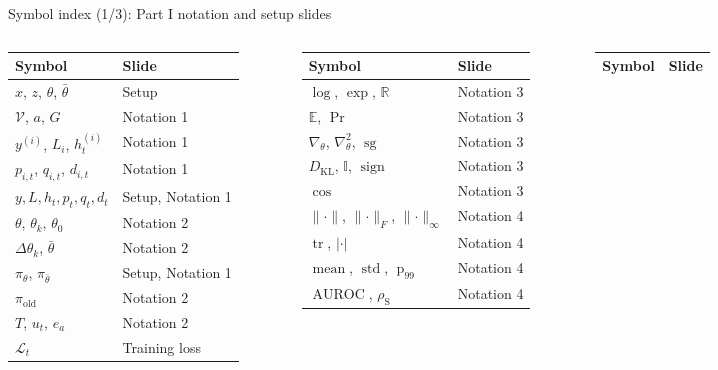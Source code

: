 \documentclass[aspectratio=169,11pt]{beamer}
\newcommand{\E}{\mathbb{E}}
\newcommand{\pit}{\pi_\theta}
\newcommand{\pitea}{\pi_{\bar\theta}}
\newcommand{\piold}{\pi_{\mathrm{old}}}
\newcommand{\sg}{\operatorname{sg}}
\newcommand{\KL}{D_{\mathrm{KL}}}
\newcommand{\Ind}{\mathbb{I}}
\newcommand{\abs}[1]{\lvert #1\rvert}
\newcommand{\norm}[1]{\lVert #1\rVert}
\newcommand{\pct}{\operatorname{p}_{99}}
\newcommand{\AUROC}{\operatorname{AUROC}}
\begin{document}
\begin{frame}{Symbol index (1/3): Part I notation and setup slides}
\scriptsize
\setlength{\tabcolsep}{3pt}\renewcommand{\arraystretch}{1.15}
\begin{columns}[T]
\begin{tabular}{@{}ll@{}}
\toprule
\textbf{Symbol} & \textbf{Slide}\\ \midrule
$x$, $z$, $\theta$, $\bar\theta$ & Setup\\
$\mathcal V$, $a$, $G$ & Notation 1\\
$y^{(i)}$, $L_i$, $h^{(i)}_t$ & Notation 1\\
$p_{i,t}$, $q_{i,t}$, $d_{i,t}$ & Notation 1\\
$y,L,h_t,p_t,q_t,d_t$ & Setup, Notation 1\\
$\theta$, $\theta_k$, $\theta_0$ & Notation 2\\
$\Delta\theta_k$, $\bar\theta$ & Notation 2\\
$\pit$, $\pitea$ & Setup, Notation 1\\
$\piold$ & Notation 2\\
$T$, $u_t$, $e_a$ & Notation 2\\
$\mathcal L_t$ & Training loss\\
\bottomrule
\end{tabular}
\begin{tabular}{@{}ll@{}}
\toprule
\textbf{Symbol} & \textbf{Slide}\\ \midrule
$\log$, $\exp$, $\mathbb R$ & Notation 3\\
$\E$, $\Pr$ & Notation 3\\
$\nabla_\theta$, $\nabla^2_\theta$, $\sg$ & Notation 3\\
$\KL$, $\Ind$, $\operatorname{sign}$ & Notation 3\\
$\cos$ & Notation 3\\
$\norm{\cdot}$, $\norm{\cdot}_F$, $\norm{\cdot}_\infty$ & Notation 4\\
$\operatorname{tr}$, $\abs{\cdot}$ & Notation 4\\
$\operatorname{mean}$, $\operatorname{std}$, $\pct$ & Notation 4\\
$\AUROC$, $\rho_{\mathrm S}$ & Notation 4\\
\bottomrule
\end{tabular}
\begin{tabular}{@{}ll@{}}
\toprule
\textbf{Symbol} & \textbf{Slide}\\ \midrule

\end{tabular}
\end{columns}
\end{frame}
\end{document}
